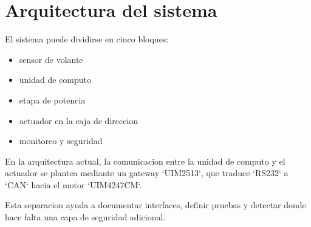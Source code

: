 \chapter{Arquitectura del sistema}

El sistema puede dividirse en cinco bloques:

\begin{itemize}
  \item sensor de volante
  \item unidad de computo
  \item etapa de potencia
  \item actuador en la caja de direccion
  \item monitoreo y seguridad
\end{itemize}

En la arquitectura actual, la comunicacion entre la unidad de computo y el
actuador se plantea mediante un gateway `UIM2513`, que traduce `RS232` a `CAN`
hacia el motor `UIM4247CM`.

Esta separacion ayuda a documentar interfaces, definir pruebas y detectar donde
hace falta una capa de seguridad adicional.
